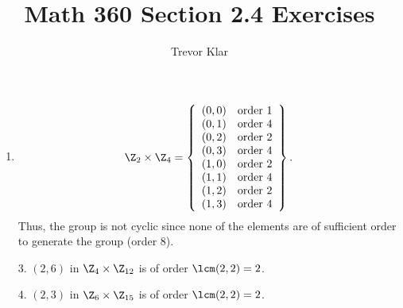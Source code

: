\documentclass[letterpaper]{article}
\title{Math 360 \linebreak
Section 2.4 Exercises}
\author{Trevor Klar}
\begin{document}
\maketitle

\begin{enumerate}

\item $$\Z_2\times\Z_4=
\left\lbrace\begin{array}{rcl}
(0,0)	&	\text{order 1} \\
(0,1)	&	\text{order 4} \\
(0,2)	&	\text{order 2} \\
(0,3)	&	\text{order 4} \\
(1,0)	&	\text{order 2} \\
(1,1)	&	\text{order 4} \\
(1,2)	&	\text{order 2} \\
(1,3)	&	\text{order 4} \\
\end{array}\right\rbrace.$$ Thus, the group is not cyclic since none of the elements are of sufficient order to generate the group (order 8). 

\item[3.] $(2,6)$ in $\Z_4\times\Z_{12}$ is of order $\lcm(2,2)=2$.
\item[4.] $(2,3)$ in $\Z_6\times\Z_{15}$ is of order $\lcm(2,2)=2$.

\end{enumerate}
\end{document}

